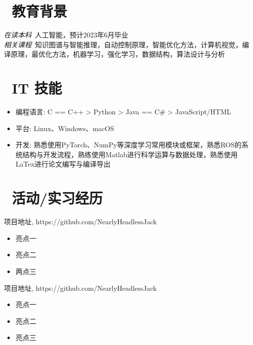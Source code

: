 \documentclass{resume}
\begin{document}

 
\section{\faGraduationCap\  教育背景}
\textit{在读本科}\ 人工智能，预计2023年6月毕业\\
\textit{相关课程}\  知识图谱与智能推理，自动控制原理，智能优化方法，计算机视觉，编译原理，最优化方法，机器学习，强化学习，数据结构，算法设计与分析

\section{\faCogs\ IT 技能}
\begin{itemize}[parsep=0.5ex]
  \item 编程语言: C == C++ > Python > Java == C\# > JavaScript/HTML
  \item 平台: Linux、Windows、macOS
  \item 开发: 熟悉使用PyTorch、NumPy等深度学习常用模块或框架，熟悉ROS的系统结构与开发流程，熟练使用Matlab进行科学运算与数据处理，熟悉使用LaTex进行论文编写与编译导出
\end{itemize}

\section{\faUsers\ 活动/实习经历}
\begin{onehalfspacing}
项目地址, https://github.com/NearlyHeadlessJack
\begin{itemize}
  \item 亮点一
  \item 亮点二
  \item 两点三
\end{itemize}
\end{onehalfspacing}

\begin{onehalfspacing}
项目地址, https://github.com/NearlyHeadlessJack
\begin{itemize}
  \item 亮点一
  \item 亮点二
  \item 亮点三
\end{itemize}
\end{onehalfspacing}
\end{document}
